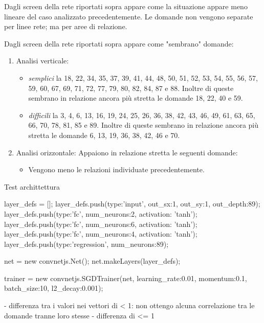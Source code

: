 Dagli screen della rete riportati sopra appare come la situazione appare meno lineare del caso analizzato precedentemente. 
Le domande non vengono separate per linee rete; ma per aree di relazione.


Dagli screen della rete riportati sopra appare come "sembrano" domande:
\begin{enumerate}
\item Analisi verticale:
\begin{itemize}
\item \textit{semplici} la 18, 22, 34, 35, 37, 39, 41, 44, 48, 50, 51, 52, 53, 54, 55, 56, 57, 59, 60, 67, 69,  71, 72, 77, 79, 80, 82, 84, 87 e 88. Inoltre di queste sembrano in relazione ancora pi\`u stretta le domande 18, 22, 40 e 59.
\item \textit{difficili} la 3, 4, 6, 13, 16, 19, 24, 25, 26, 36, 38, 42, 43, 46, 49, 61, 63, 65, 66, 70, 78, 81, 85 e 89. Inoltre di queste sembrano in relazione ancora pi\`u stretta le domande 6, 13, 19, 36, 38, 42, 46 e 70.
\end{itemize}
\item Analisi orizzontale:
Appaiono in relazione stretta le seguenti domande:
\begin{itemize}
\item Vengono meno le relazioni individuate precedentemente.
\end{itemize}
\end{enumerate}

Test archittettura 

layer_defs = [];
layer_defs.push({type:'input', out_sx:1, out_sy:1, out_depth:89});
layer_defs.push({type:'fc', num_neurons:2, activation: 'tanh'});
layer_defs.push({type:'fc', num_neurons:6, activation: 'tanh'});
layer_defs.push({type:'fc', num_neurons:4, activation: 'tanh'});
layer_defs.push({type:'regression', num_neurons:89});

net = new convnetjs.Net();
net.makeLayers(layer_defs);

trainer = new convnetjs.SGDTrainer(net, {learning_rate:0.01, momentum:0.1, batch_size:10, l2_decay:0.001});

- differenza tra i valori nei vettori di < 1: non ottengo alcuna correlazione tra le domande tranne loro stesse
- differenza di <= 1

